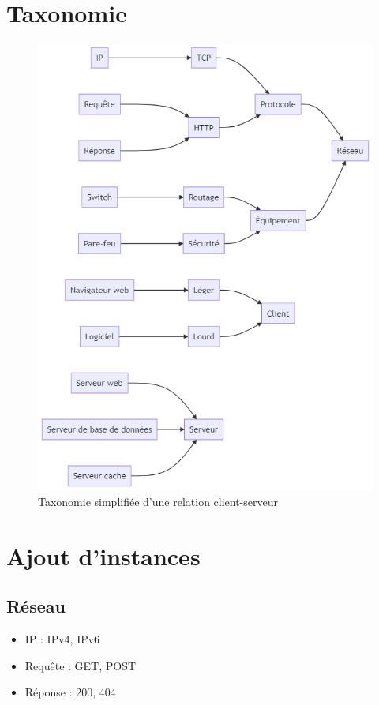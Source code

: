 \documentclass{article}
\begin{document}
\section{Taxonomie}
\begin{figure}[ht]
    \centering
    \includegraphics[width=\textwidth, height=\dimexpr\textheight-6.3cm\relax, keepaspectratio]{../images/mermaid_v1.png}
    \caption{Taxonomie simplifiée d'une relation client-serveur}
    \label{fig:Schéma de la taxonomie}
\end{figure}

\section{Ajout d'instances}

\subsection{Réseau}
\begin{itemize}
    \item IP : IPv4, IPv6
    \item Requête : GET, POST
    \item Réponse : 200, 404
\end{itemize}
\end{document}
